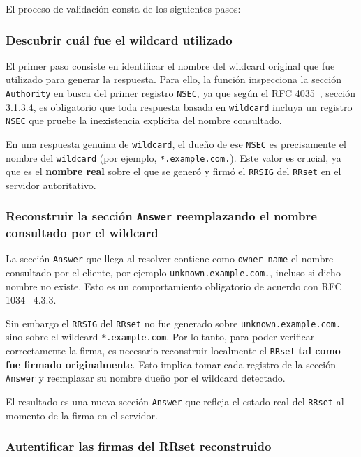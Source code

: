 El proceso de validación consta de los siguientes pasos:

\subsubsection{Descubrir cuál fue el wildcard utilizado}

El primer paso consiste en identificar el nombre del wildcard original que fue utilizado para generar la respuesta.
Para ello, la función inspecciona la sección \texttt{Authority} en busca del primer registro \texttt{NSEC}, ya que según el RFC 4035~\cite{RFC4035}, sección 3.1.3.4, es obligatorio
que toda respuesta basada en \texttt{wildcard} incluya un registro \texttt{NSEC} que pruebe la inexistencia explícita del nombre consultado.

En una respuesta genuina de \texttt{wildcard}, el dueño de ese \texttt{NSEC} es precisamente el nombre del \texttt{wildcard} (por ejemplo, \texttt{*.example.com.}).
Este valor es crucial, ya que es el \textbf{nombre real} sobre el que se generó y firmó el \texttt{RRSIG} del \texttt{RRset} en el servidor autoritativo.


\subsubsection{Reconstruir la sección \texttt{Answer} reemplazando el nombre consultado por el wildcard}

La sección \texttt{Answer} que llega al resolver contiene como \texttt{owner name} el nombre consultado por el cliente, por ejemplo \texttt{unknown.example.com.}, incluso si dicho nombre no existe.
Esto es un comportamiento obligatorio de acuerdo con RFC 1034~\cite{RFC1034} 4.3.3.

Sin embargo el \texttt{RRSIG} del \texttt{RRset} no fue generado sobre  \texttt{unknown.example.com.} sino sobre el wildcard \texttt{*.example.com}. Por lo tanto, 
para poder verificar correctamente la firma, es necesario reconstruir localmente el \texttt{RRset}  \textbf{tal como fue firmado originalmente}. Esto implica tomar cada registro de la 
sección \texttt{Answer} y reemplazar su nombre dueño por el wildcard detectado.

El resultado es una nueva sección \texttt{Answer} que refleja el estado real del \texttt{RRset} al momento de la firma en el servidor.

\subsubsection{Autentificar las firmas del RRset reconstruido}

